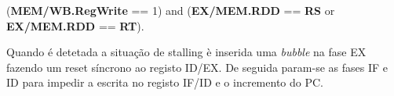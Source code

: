 \documentclass[10pt,a4paper]{book}
\begin{document}
	(\textbf{MEM/WB.RegWrite} == 1) and (\textbf{EX/MEM.RDD} == \textbf{RS} or \textbf{EX/MEM.RDD} == \textbf{RT}).

	Quando é detetada a situação de stalling è inserida uma \textit{bubble} na fase EX fazendo um reset síncrono ao registo ID/EX. De seguida param-se as fases IF e ID para impedir a escrita no registo IF/ID e o incremento do PC.













 		\printindex
\end{document}
